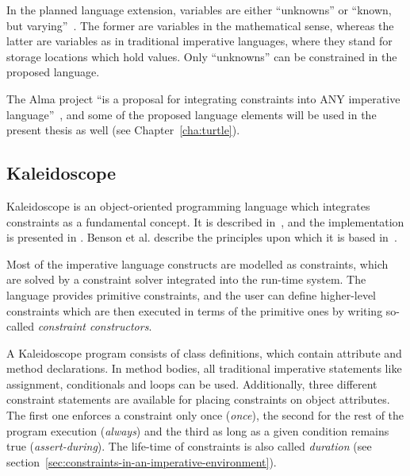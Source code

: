 %
In the planned language extension, variables are either ``unknowns''
or ``known, but varying''~\cite[p.~5]{apt98almaproject}.  The former
are variables in the mathematical sense, whereas the latter are
variables as in traditional imperative languages, where they stand for
storage locations which hold values.  Only ``unknowns'' can be
constrained in the proposed language.

The Alma project ``is a proposal for integrating constraints into ANY
imperative language''~\cite[p.~6]{apt98almaproject}, and some of the
proposed language elements will be used in the present thesis as well
(see Chapter~\ref{cha:turtle}).

\subsection{Kaleidoscope}


Kaleidoscope is an object-oriented programming language which
integrates constraints as a fundamental concept.  It is described
in~\cite{lopez94kaleidoscope}, and the implementation is presented in
\cite{lopez94implementing}.  Benson et al. describe the principles
upon which it is based in~\cite{benson92int, benson91cip}.


Most of the imperative language constructs are modelled as
constraints, which are solved by a constraint solver integrated into
the run-time system.  The language provides primitive constraints, and
the user can define higher-level constraints which are then executed
in terms of the primitive ones by writing so-called {\em constraint
  constructors}.

A Kaleidoscope program consists of class definitions, which contain
attribute and method declarations.  In method bodies, all traditional
imperative statements like assignment, conditionals and loops can be
used.  Additionally, three different constraint statements are
available for placing constraints on object attributes.  The first one
enforces a constraint only once ({\em once}), the second for the rest
of the program execution ({\em always}) and the third as long as a
given condition remains true ({\em assert-during}).  The life-time of
constraints is also called {\em duration} (see
section~\ref{sec:constraints-in-an-imperative-environment}).

